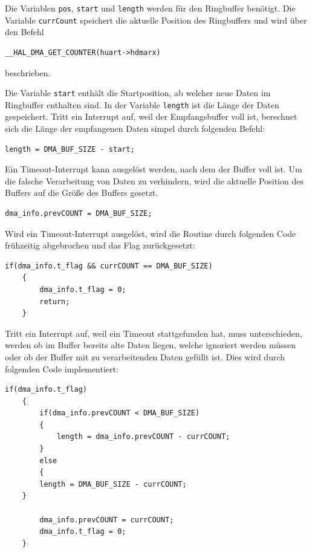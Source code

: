   \smallskip

  Die Variablen \lstinline!pos!, \lstinline!start! und \lstinline!length! werden für den Ringbuffer benötigt. Die Variable \lstinline!currCount! speichert die aktuelle Position des
  Ringbuffers und wird über den Befehl
  
  \begin{lstlisting}[caption={\textit{Position Ringbuffer}}]
    __HAL_DMA_GET_COUNTER(huart->hdmarx)
  \end{lstlisting}
  beschrieben.

  \newpage

  Die Variable \lstinline!start! enthält die Startposition, ab welcher neue Daten im Ringbuffer enthalten sind. In der Variable \lstinline!length!
  ist die Länge der Daten gespeichert. Tritt ein Interrupt auf, weil der Empfangsbuffer voll ist, berechnet sich die Länge der empfangenen 
  Daten simpel durch folgenden Befehl:
  
  \begin{lstlisting}[caption={\textit{Berechnung Länge}}]
    length = DMA_BUF_SIZE - start;
  \end{lstlisting}
  
  Ein Timeout-Interrupt kann ausgelöst werden, nach dem der Buffer voll ist. Um die falsche Verarbeitung von 
  Daten zu verhindern, wird die aktuelle Position des Buffers auf die Größe des Buffers gesetzt.
  
  \begin{lstlisting}[caption={\textit{Setzen des Zählers bei Timeout}}]
    dma_info.prevCOUNT = DMA_BUF_SIZE;      
  \end{lstlisting}

  
  Wird ein Timeout-Interrupt ausgelöst, wird die Routine durch folgenden Code frühzeitig abgebrochen und das Flag zurückgesetzt:
  
  \begin{lstlisting}[caption={\textit{Abbruch Timeoutinterrupt}}]
    if(dma_info.t_flag && currCOUNT == DMA_BUF_SIZE)
    {
        dma_info.t_flag = 0;
        return;
    }
  \end{lstlisting}

  \smallskip

  Tritt ein Interrupt auf, weil ein Timeout stattgefunden hat, muss unterschieden, werden ob im Buffer bereits alte Daten liegen, welche ignoriert
  werden müssen oder ob der Buffer mit zu verarbeitenden Daten gefüllt ist. Dies wird durch folgenden Code implementiert:

  \begin{lstlisting}[caption={\textit{Längenberechnung Timeout}}]
    if(dma_info.t_flag)
    {
    	if(dma_info.prevCOUNT < DMA_BUF_SIZE)
    	{
    		length = dma_info.prevCOUNT - currCOUNT;
    	}
    	else
    	{
  		length = DMA_BUF_SIZE - currCOUNT;
  	}

        dma_info.prevCOUNT = currCOUNT;
        dma_info.t_flag = 0;
    }
  \end{lstlisting}

